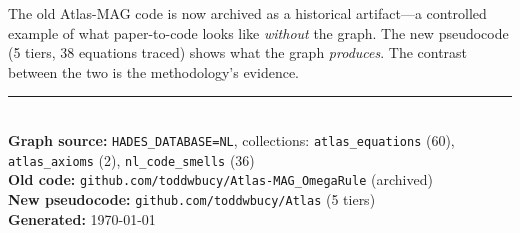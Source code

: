 \documentclass[11pt,letterpaper]{article}
\begin{document}
The old Atlas-MAG code is now archived as a historical artifact---a controlled
example of what paper-to-code looks like \emph{without} the graph. The new
pseudocode (5 tiers, 38 equations traced) shows what the graph \emph{produces}.
The contrast between the two is the methodology's evidence.

\vfill
\noindent\rule{\textwidth}{0.4pt}\\
{\footnotesize
  \textbf{Graph source:} \texttt{HADES\_DATABASE=NL}, collections:
  \texttt{atlas\_equations} (60), \texttt{atlas\_axioms} (2),
  \texttt{nl\_code\_smells} (36)\\
  \textbf{Old code:} \texttt{github.com/toddwbucy/Atlas-MAG\_OmegaRule} (archived)\\
  \textbf{New pseudocode:} \texttt{github.com/toddwbucy/Atlas} (5 tiers)\\
  \textbf{Generated:} \today
}
\end{document}
